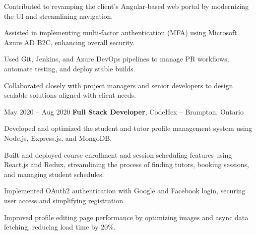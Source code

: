 \vspace{0.10 cm}
\begin{onecolentry}
\begin{highlights}
    \item Contributed to revamping the client's Angular-based web portal by modernizing the UI and streamlining navigation.
    \item Assisted in implementing multi-factor authentication (MFA) using Microsoft Azure AD B2C, enhancing overall security.
    \item Used Git, Jenkins, and Azure DevOps pipelines to manage PR workflows, automate testing, and deploy stable builds.
    \item Collaborated closely with project managers and senior developers to design scalable solutions aligned with client needs.
\end{highlights}
\end{onecolentry}

\vspace{0.27 cm}

\begin{twocolentry}{May 2020 – Aug 2020}
    \textbf{Full Stack Developer}, CodeHex – Brampton, Ontario
\end{twocolentry}

\vspace{0.10 cm}
\begin{onecolentry}
\begin{highlights}
    \item Developed and optimized the student and tutor profile management system using Node.js, Express.js, and MongoDB.
    \item Built and deployed course enrollment and session scheduling features using React.js and Redux, streamlining the process of finding tutors, booking sessions, and managing student schedules.
    \item Implemented OAuth2 authentication with Google and Facebook login, securing user access and simplifying registration.
    \item Improved profile editing page performance by optimizing images and async data fetching, reducing load time by 20\%.
\end{highlights}
\end{onecolentry}
